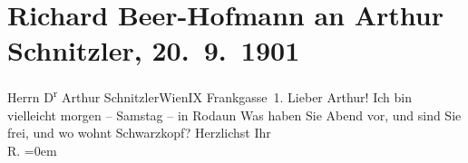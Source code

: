 

         
         \renewcommand{\erwaehntePersonen}{Personen: Gustav Schwarzkopf}
         \renewcommand{\erwaehnteOrte}{Orte: Frankgasse 1, IX., Alsergrund, Rodaun, Wien}
         \renewcommand{\erwaehnteWerke}{}
               \section[Richard Beer-Hofmann an Arthur Schnitzler, 20. 9. 1901]{ Richard Beer-Hofmann an Arthur Schnitzler, 20. 9. 1901}\nopagebreak{}\rehead{ }\begin{ledgroupsized}[t]{13cm}\normalsize\beginnumbering \toendnotes[C]{\smallbreak\pagebreak[2]} 
\pstart{}{\pb}Herrn D\textsuperscript{r} Arthur Schnitzler\pend{}\pstart{}Wien\pend{}\pstart{}IX Frankgasse 1.\pend{}{\bigskip}\pstart
           \noindent{}{\pb}Lieber Arthur! Ich bin vielleicht morgen – Samstag – in
                  Rodaun\pend
           \pstart
           Was haben Sie Abend vor, und sind Sie frei, und wo wohnt Schwarzkopf?\pend
           \pstart
           Herzlichst Ihr{\\[\baselineskip]}\spacefill\mbox{R.}\pend
           \leftskip=0em{}
         
         \endnumbering{}\end{ledgroupsized}  \newcommand{\dateiname}{L01174}\newcommand{\titel}{Richard Beer-Hofmann an Arthur Schnitzler, 20. 9. 1901}\newcommand{\editorInnen}{Martin Anton Müller und Gerd-Hermann Susen}
      